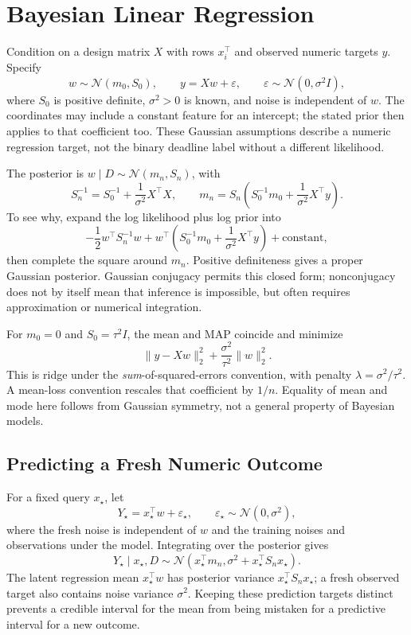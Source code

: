 \section{Bayesian Linear Regression}

Condition on a design matrix $X$ with rows $x_i^\top$ and observed numeric targets $y$. Specify
\[
w\sim\mathcal N(m_0,S_0),\qquad
y=Xw+\varepsilon,\qquad
\varepsilon\sim\mathcal N(0,\sigma^2I),
\]
where $S_0$ is positive definite, $\sigma^2>0$ is known, and noise is independent of $w$. The coordinates may include a constant feature for an intercept; the stated prior then applies to that coefficient too. These Gaussian assumptions describe a numeric regression target, not the binary deadline label without a different likelihood.

The posterior is $w\mid D\sim\mathcal N(m_n,S_n)$, with
\[
S_n^{-1}=S_0^{-1}+\frac1{\sigma^2}X^\top X,
\qquad
m_n=S_n\left(S_0^{-1}m_0+\frac1{\sigma^2}X^\top y\right).
\]
To see why, expand the log likelihood plus log prior into
\[
-\frac12w^\top S_n^{-1}w
+w^\top\left(S_0^{-1}m_0+\frac1{\sigma^2}X^\top y\right)
+\text{constant},
\]
then complete the square around $m_n$. Positive definiteness gives a proper Gaussian posterior. Gaussian conjugacy permits this closed form; nonconjugacy does not by itself mean that inference is impossible, but often requires approximation or numerical integration.

For $m_0=0$ and $S_0=\tau^2I$, the mean and MAP coincide and minimize
\[
\|y-Xw\|_2^2+\frac{\sigma^2}{\tau^2}\|w\|_2^2.
\]
This is ridge under the \emph{sum}-of-squared-errors convention, with penalty $\lambda=\sigma^2/\tau^2$. A mean-loss convention rescales that coefficient by $1/n$. Equality of mean and mode here follows from Gaussian symmetry, not a general property of Bayesian models.

\subsection{Predicting a Fresh Numeric Outcome}

For a fixed query $x_\star$, let
\[
Y_\star=x_\star^\top w+\varepsilon_\star,
\qquad \varepsilon_\star\sim\mathcal N(0,\sigma^2),
\]
where the fresh noise is independent of $w$ and the training noises and observations under the model. Integrating over the posterior gives
\[
Y_\star\mid x_\star,D\sim
\mathcal N\!\left(x_\star^\top m_n,
\sigma^2+x_\star^\top S_nx_\star\right).
\]
The latent regression mean $x_\star^\top w$ has posterior variance $x_\star^\top S_nx_\star$; a fresh observed target also contains noise variance $\sigma^2$. Keeping these prediction targets distinct prevents a credible interval for the mean from being mistaken for a predictive interval for a new outcome.

